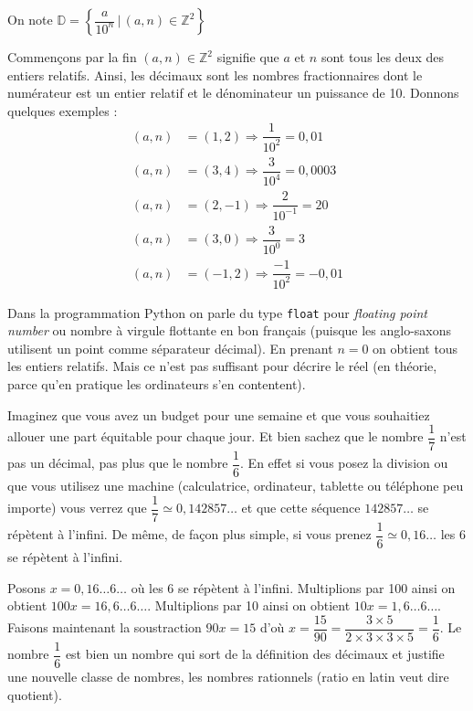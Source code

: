 \documentclass[11pt]{article}
\begin{document}
On note \(\mathbb{D} = \left\{ \dfrac{a}{10^n}\,|\,(a,
   n)\in\mathbb{Z}^2\right\}\)

Commençons par la fin \((a, n)\in\mathbb{Z}^2\) signifie que \(a\) et
\(n\) sont tous les deux des entiers relatifs. Ainsi, les décimaux
sont les nombres fractionnaires dont le numérateur est un entier
relatif et le dénominateur un puissance de 10. Donnons quelques
exemples :
\begin{align}
(a, n) &= (1, 2)\Rightarrow \dfrac{1}{10^2} = 0,01\\
(a, n) &= (3, 4)\Rightarrow \dfrac{3}{10^4} = 0,0003\\
(a, n) &= (2, -1)\Rightarrow \dfrac{2}{10^{-1}} = 20\\
(a, n) &= (3, 0)\Rightarrow \dfrac{3}{10^0} = 3\\
(a, n) &= (-1, 2)\Rightarrow \dfrac{-1}{10^2} = -0,01
\end{align}

Dans la programmation Python on parle du type \texttt{float} pour
\emph{floating point number} ou nombre à virgule flottante en bon
français (puisque les anglo-saxons utilisent un point comme
séparateur décimal). En prenant \(n = 0\) on obtient tous les entiers
relatifs. Mais ce n'est pas suffisant pour décrire le réel (en
théorie, parce qu'en pratique les ordinateurs s'en contentent).

Imaginez que vous avez un budget pour une semaine et que vous
souhaitiez allouer une part équitable pour chaque jour. Et bien
sachez que le nombre \(\dfrac{1}{7}\) n'est pas un décimal, pas plus
que le nombre \(\dfrac{1}{6}\). En effet si vous posez la division ou
que vous utilisez une machine (calculatrice, ordinateur, tablette
ou téléphone peu importe) vous verrez que \(\dfrac{1}{7} \simeq
   0,142857\dots\) et que cette séquence \(142857\dots\) se répètent à
l'infini. De même, de façon plus simple, si vous prenez
\(\dfrac{1}{6} \simeq 0,16\dots\) les 6 se répètent à l'infini.

Posons \(x = 0,16\dots 6\dots\) où les 6 se répètent à
l'infini. Multiplions par 100 ainsi on obtient \(100x = 16,6\dots
   6\dots\). Multiplions par 10 ainsi on obtient \(10x = 1,6\dots
   6\dots\). Faisons maintenant la soustraction \(90x = 15\) d'où \(x =
   \dfrac{15}{90} = \dfrac{3\times 5}{2\times 3\times 3\times 5} =
   \dfrac{1}{6}\). Le nombre \(\dfrac{1}{6}\) est bien un nombre qui sort
de la définition des décimaux et justifie une nouvelle classe de
nombres, les nombres rationnels (ratio en latin veut dire
quotient).
\end{document}
